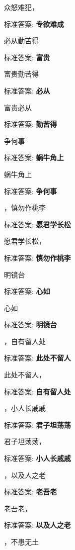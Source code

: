\documentclass[12pt, a4paper, addpoints]{exam}
\begin{document}
\begin{multicols}{2}
\begin{questions}
\question[1] 众怒难犯，\uline{\qquad\qquad\qquad}

标准答案: \textbf{专欲难成}

\question[1] \uline{\qquad\qquad\qquad}必从勤苦得

标准答案: \textbf{富贵}

\question[1] 富贵\uline{\qquad\qquad\qquad}勤苦得

标准答案: \textbf{必从}

\question[1] 富贵必从\uline{\qquad\qquad\qquad}

标准答案: \textbf{勤苦得}

\question[1] \uline{\qquad\qquad\qquad}争何事

标准答案: \textbf{蜗牛角上}

\question[1] 蜗牛角上\uline{\qquad\qquad\qquad}

标准答案: \textbf{争何事}

\question[1] \uline{\qquad\qquad\qquad}，慎勿作桃李

标准答案: \textbf{愿君学长松}

\question[1] 愿君学长松，\uline{\qquad\qquad\qquad}

标准答案: \textbf{慎勿作桃李}

\question[1] \uline{\qquad\qquad\qquad}明镜台

标准答案: \textbf{心如}

\question[1] 心如\uline{\qquad\qquad\qquad}

标准答案: \textbf{明镜台}

\question[1] \uline{\qquad\qquad\qquad}，自有留人处

标准答案: \textbf{此处不留人}

\question[1] 此处不留人，\uline{\qquad\qquad\qquad}

标准答案: \textbf{自有留人处}

\question[1] \uline{\qquad\qquad\qquad}，小人长戚戚

标准答案: \textbf{君子坦荡荡}

\question[1] 君子坦荡荡，\uline{\qquad\qquad\qquad}

标准答案: \textbf{小人长戚戚}

\question[1] \uline{\qquad\qquad\qquad}，以及人之老

标准答案: \textbf{老吾老}

\question[1] 老吾老，\uline{\qquad\qquad\qquad}

标准答案: \textbf{以及人之老}

\question[1] \uline{\qquad\qquad\qquad}，不患无土


\end{questions}
\end{multicols}
\end{document}
